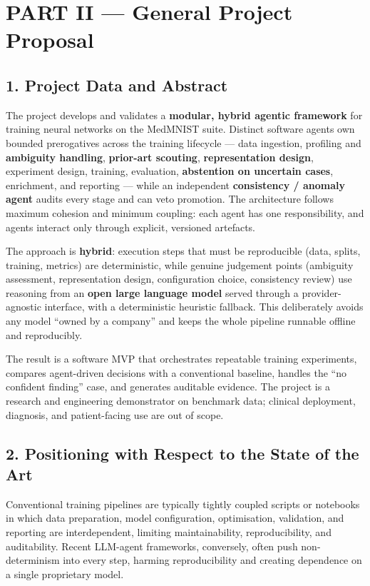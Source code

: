 \documentclass[11pt,a4paper]{article}
\begin{document}
\section*{PART II --- General Project Proposal}

\subsection*{1. Project Data and Abstract}
The project develops and validates a \textbf{modular, hybrid agentic framework} for training neural networks on the MedMNIST suite. Distinct software agents own bounded prerogatives across the training lifecycle --- data ingestion, profiling and \textbf{ambiguity handling}, \textbf{prior-art scouting}, \textbf{representation design}, experiment design, training, evaluation, \textbf{abstention on uncertain cases}, enrichment, and reporting --- while an independent \textbf{consistency / anomaly agent} audits every stage and can veto promotion. The architecture follows maximum cohesion and minimum coupling: each agent has one responsibility, and agents interact only through explicit, versioned artefacts.

The approach is \textbf{hybrid}: execution steps that must be reproducible (data, splits, training, metrics) are deterministic, while genuine judgement points (ambiguity assessment, representation design, configuration choice, consistency review) use reasoning from an \textbf{open large language model} served through a provider-agnostic interface, with a deterministic heuristic fallback. This deliberately avoids any model ``owned by a company'' and keeps the whole pipeline runnable offline and reproducibly.

The result is a software MVP that orchestrates repeatable training experiments, compares agent-driven decisions with a conventional baseline, handles the ``no confident finding'' case, and generates auditable evidence. The project is a research and engineering demonstrator on benchmark data; clinical deployment, diagnosis, and patient-facing use are out of scope.

\subsection*{2. Positioning with Respect to the State of the Art}
Conventional training pipelines are typically tightly coupled scripts or notebooks in which data preparation, model configuration, optimisation, validation, and reporting are interdependent, limiting maintainability, reproducibility, and auditability. Recent LLM-agent frameworks, conversely, often push non-determinism into every step, harming reproducibility and creating dependence on a single proprietary model.
\end{document}
